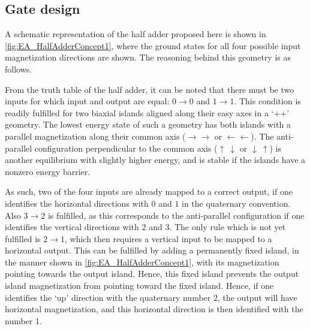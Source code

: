 \documentclass[twocolumn]{phdsymp}
\begin{document}
\subsection{Gate design}
A schematic representation of the half adder proposed here is shown in \cref{fig:EA_HalfAdderConcept1}, where the ground states for all four possible input magnetization directions are shown. The reasoning behind this geometry is as follows. \par
From the truth table of the half adder, it can be noted that there must be two inputs for which input and output are equal: $0\rightarrow0$ and $1\rightarrow1$. This condition is readily fulfilled for two biaxial islands aligned along their easy axes in a `++' geometry. The lowest energy state of such a geometry has both islands with a parallel magnetization along their common axis ($\rightarrow \rightarrow$ or $\leftarrow \leftarrow$). The anti-parallel configuration perpendicular to the common axis ($\uparrow~\downarrow$ or $\downarrow~\uparrow$) is another equilibrium with slightly higher energy, and is stable if the islands have a nonzero energy barrier. \par
As such, two of the four inputs are already mapped to a correct output, if one identifies the horizontal directions with $0$ and $1$ in the quaternary convention. Also $3\rightarrow2$ is fulfilled, as this corresponds to the anti-parallel configuration if one identifies the vertical directions with $2$ and $3$. The only rule which is not yet fulfilled is $2\rightarrow1$, which then requires a vertical input to be mapped to a horizontal output. This can be fulfilled by adding a permanently fixed island, in the manner shown in \cref{fig:EA_HalfAdderConcept1}, with its magnetization pointing towards the output island. Hence, this fixed island prevents the output island magnetization from pointing toward the fixed island. Hence, if one identifies the `up' direction with the quaternary number 2, the output will have horizontal magnetization, and this horizontal direction is then identified with the number 1. \par
\end{document}
